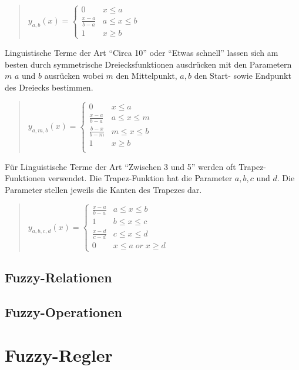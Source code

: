 \documentclass[12pt,a4paper,bibliography=totocnumbered,listof=totocnumbered]{article}
\theoremstyle{Umgebung}
\begin{document}
\begin{quotation}
$y_{a,b}(x)=\begin{cases}
0				& x \leq a \\
\frac{x-a}{b-a} & a \leq x \leq b \\
1 				& x \geq b 
\end{cases}$
\end{quotation}

Linguistische Terme der Art \enquote{Circa 10} oder \enquote{Etwas schnell} lassen sich am besten durch symmetrische Dreiecksfunktionen ausdrücken mit den Parametern $m$ $a$ und $b$ ausrücken wobei $m$ den Mittelpunkt, $a, b$ den Start- sowie Endpunkt des Dreiecks bestimmen.

\begin{quotation}
$y_{a,m,b}(x)=\begin{cases}
0				& x \leq a \\
\frac{x-a}{b-a} & a \leq x \leq m  \\
\frac{b-x}{b-m} & m \leq x \leq b  \\
1 				& x \geq b \\
\end{cases}$
\end{quotation}

Für Linguistische Terme der Art \enquote{Zwischen 3 und 5} werden oft Trapez-Funktionen verwendet. Die Trapez-Funktion hat die Parameter $a,b,c$ und $d$. Die Parameter stellen jeweils die Kanten des Trapezes dar.

\begin{quotation}
$y_{a,b,c,d}(x)=\begin{cases}
\frac{x-a}{b-a} & a \leq x \leq b  \\
1 				& b \leq x \leq c \\
\frac{x-d}{c-d} & c \leq x \leq d \\
0				& x \le a \; or \; x \ge d  
\end{cases}$
\end{quotation}



\subsection{Fuzzy-Relationen}

\subsection{Fuzzy-Operationen}

\section{Fuzzy-Regler}
\end{document}
